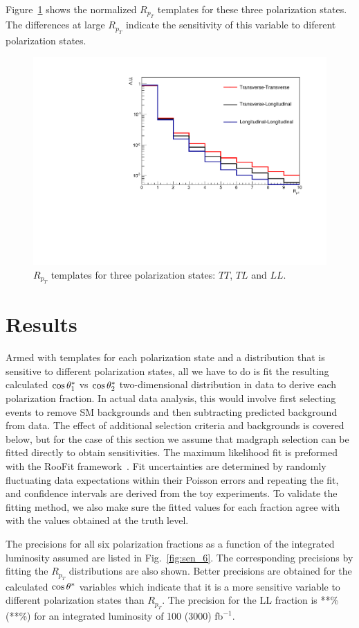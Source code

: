 Figure~\ref{fig:Rpt} shows the normalized $R_{p_T}$ templates for these three polarization states. The differences at large $R_{p_T}$ indicate the sensitivity 
of this variable to diferent polarization states.
\begin{figure}
\includegraphics[width=.45\textwidth]{./fig/templates_2D.pdf}
\caption{\label{fig:Rpt}$R_{p_T}$ templates for three polarization states: $TT$, $TL$ and $LL$.}
\end{figure}

\section{Results}

Armed with templates for each polarization state and a distribution that is sensitive to different polarization states,  
all we have to do is fit the resulting calculated $ \cos \theta^{*}  _1$ vs $ \cos \theta^{*}  _2$ two-dimensional distribution in data to derive each polarization fraction. 
In actual data analysis, this would involve first selecting events to remove SM backgrounds and then subtracting predicted background from data. 
The effect of additional selection criteria and backgrounds is covered below, but for the case of this section we assume that 
{\sc madgraph} selection can be fitted directly to obtain sensitivities. 
The maximum likelihood fit is preformed with the RooFit framework~\cite{aa}. Fit uncertainties are determined by 
randomly fluctuating data expectations within their Poisson errors and repeating the fit, and confidence intervals are derived from the toy experiments. 
To validate the fitting method, we also make sure the fitted values for each fraction agree with with the values obtained at the truth level.  

The precisions for all six polarization fractions as a function of the integrated luminosity assumed are listed in Fig.~\ref{fig:sen_6}. 
The corresponding precisions by fitting the $R_{p_T}$ distributions are also shown. Better precisions are obtained for the calculated $ \cos \theta^{*}  $ 
variables which indicate that it is a more sensitive variable to different polarization states than $R_{p_T}$.  
The precision for the LL fraction is **\% (**\%) for an integrated luminosity of 100 (3000) fb$^{-1}$.

